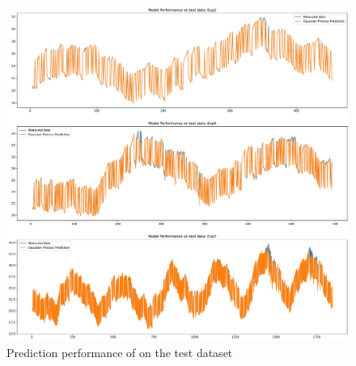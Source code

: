\begin{figure}[ht]
    \centering
    \includegraphics[width = \textwidth]{Plots/GP_113_test_performance.pdf}
    \caption{Prediction performance of  on the test dataset}
    \label{fig:GP_test_validation}
\end{figure}

\clearpage

\subsection{\texorpdfstring{}{213}}

